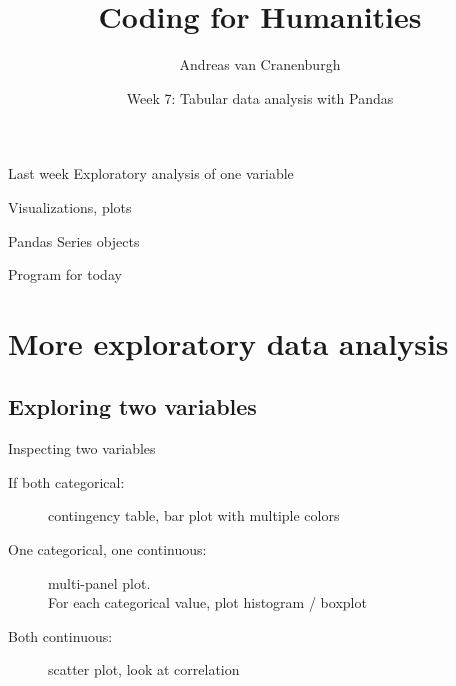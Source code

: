\documentclass[aspectratio=169,usenames,dvipsnames]{beamer}
\title{Coding for Humanities}
\author{Andreas van Cranenburgh}
\date{Week 7: Tabular data analysis with Pandas}
\begin{document}
\maketitle


\begin{frame}{Last week}
    Exploratory analysis of one variable

    \vspace{1em}
    Visualizations, plots

    \vspace{1em}
    Pandas Series objects
\end{frame}

\begin{frame}{Program for today}
\tableofcontents
\end{frame}



\section{More exploratory data analysis}
\subsection{Exploring two variables}
\frame{\tableofcontents[currentsubsection]}

\begin{frame}{Inspecting two variables}
\begin{description}
    \item[If both categorical:]
            contingency table, bar plot with multiple colors
    \item[One categorical, one continuous:] multi-panel plot.\\
            For each categorical value, plot histogram / boxplot
    \item[Both continuous:]
         scatter plot, look at correlation
\end{description}
\end{frame}
\end{document}
